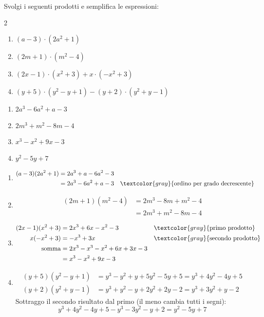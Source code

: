 \begin{question}[ID=1.3, subtitle={Prodotti di polinomi e semplificazione}, tags={prodotti, polinomi}, difficulty=media]
Svolgi i seguenti prodotti e semplifica le espressioni:
\begin{center}\begin{minipage}{0.92\linewidth}
\begin{multicols}{2}
\begin{enumerate}[leftmargin=3.2cm]
\item $(a-3) \cdot (2a^2+1)$
\item $(2m+1) \cdot (m^2-4)$
\item $(2x-1) \cdot (x^2+3) + x \cdot (-x^2 +3)$
\item $(y+5) \cdot (y^2-y+1) - (y+2)\cdot (y^2+y-1)$
\end{enumerate}
\end{multicols}
\end{minipage}\end{center}
\begin{solution}
\begin{enumerate}
    \item $2a^3-6a^2+a-3$
    \item $2m^3+m^2-8m-4$
    \item $x^3-x^2+9x-3$
    \item $y^2-5y+7$
\end{enumerate}
\end{solution}
\begin{explanation}
\begin{enumerate}
    \item \[\begin{aligned}
    (a-3)(2a^2+1) &= 2a^3+a-6a^2-3\\
    &= 2a^3-6a^2+a-3 && \textcolor{gray}{\text{ordino per grado decrescente}}
    \end{aligned}\]
    \item \[\begin{aligned}
    (2m+1)(m^2-4) &= 2m^3-8m+m^2-4\\
    &= 2m^3+m^2-8m-4
    \end{aligned}\]
    \item \[\begin{aligned}
    (2x-1)(x^2+3) &= 2x^3+6x-x^2-3 && \textcolor{gray}{\text{primo prodotto}}\\
    x(-x^2+3) &= -x^3+3x && \textcolor{gray}{\text{secondo prodotto}}\\
    \text{somma} &= 2x^3-x^3-x^2+6x+3x-3\\
    &= x^3-x^2+9x-3
    \end{aligned}\]
    \item \[\begin{aligned}
    (y+5)(y^2-y+1) &= y^3-y^2+y+5y^2-5y+5=y^3+4y^2-4y+5\\
    (y+2)(y^2+y-1) &= y^3+y^2-y+2y^2+2y-2=y^3+3y^2+y-2
    \end{aligned}\]
    Sottraggo il secondo risultato dal primo (il meno cambia tutti i segni):
    \[ y^3+4y^2-4y+5-y^3-3y^2-y+2=y^2-5y+7 \]
\end{enumerate}
\end{explanation}
\end{question}

